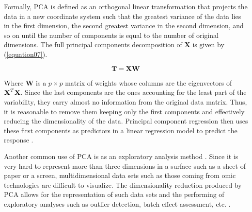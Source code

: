 Formally, PCA is defined as an orthogonal linear transformation that projects the data in a new coordinate system such that the greatest variance of the data lies in the first dimension, the second greatest variance in the second dimension, and so on until the number of components is equal to the number of original dimensions. The full principal components decomposition of \textbf{X} is given by (\autoref{equation07}).

\begin{equation}
\label{equation07}
\textbf{\text{T}} = \textbf{\text{XW}}
\end{equation}

Where \textbf{W} is a $p \times p$ matrix of weights whose columns are the eigenvectors of $\textbf{\text{X}}^T\textbf{\text{X}}$. Since the last components are the ones accounting for the least part of the variability, they carry almost no information from the original data matrix. Thus, it is reasonable to remove them keeping only the first components and effectively reducing the dimensionality of the data. Principal component regression then uses these first components as predictors in a linear regression model to predict the response \parencite{jolliffe1982note}.

Another common use of PCA is as an exploratory analysis method \parencite{tsai2007dimensionality}. Since it is very hard to represent more than three dimensions in a surface such as a sheet of paper or a screen, multidimensional data sets such as those coming from omic technologies are difficult to visualize. The dimensionality reduction produced by PCA allows for the representation of such data sets and the performing of exploratory analyses such as outlier detection, batch effect assessment, etc. \parencite{meglen1992examining}.
